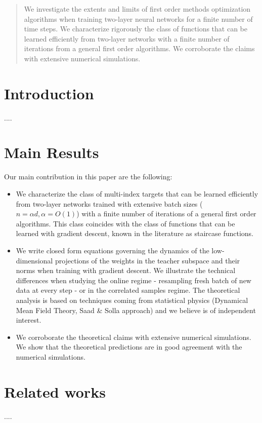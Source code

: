 \documentclass{article}
\theoremstyle{plain}
\theoremstyle{definition}
\theoremstyle{remark}
\begin{document}
\printAffiliationsAndNotice{\icmlEqualContribution} %

\begin{abstract}
    We investigate the extents and limits of first order methods optimization algorithms when training two-layer neural networks for a finite number of time steps. We characterize rigorously the class of functions that can be learned efficiently from two-layer networks with a finite number of iterations from a general first order algorithms. We corroborate the claims with extensive numerical simulations. 
\end{abstract}

\section{Introduction}
....
\section{Main Results}
Our main contribution in this paper are the following: 
\begin{itemize} 
    \item We characterize the class of multi-index targets that can be learned efficiently from two-layer networks trained with extensive batch sizes ($n = \alpha d, \alpha = O(1)$) with a finite number of iterations of a general first order algorithms. This class coincides with the class of functions that can be learned with gradient descent, known in the literature as staircase functions.
    \item We write closed form equations governing the dynamics of the low-dimensional projections of the weights in the teacher subspace and their norms when training with gradient descent. We illustrate the technical differences when studying the online regime - resampling fresh batch of new data at every step - or in the correlated samples regime. The theoretical analysis is based on techniques coming from statistical physics (Dynamical Mean Field Theory, Saad & Solla approach) and we believe is of independent interest.
    \item We corroborate the theoretical claims with extensive numerical simulations. We show that the theoretical predictions are in good agreement with the numerical simulations.
\end{itemize}

\section{Related works}
....
\end{document}
